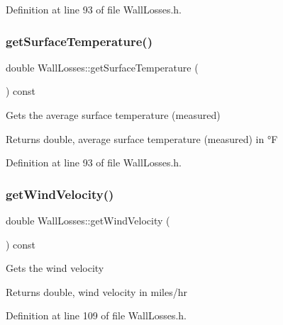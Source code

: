 Definition at line 93 of file Wall\+Losses.\+h.

\mbox{\label{class_wall_losses_ac2ce3cea6eef435a5fcf6a659b8e7d70}} 
\subsubsection{\texorpdfstring{get\+Surface\+Temperature()}{getSurfaceTemperature()}\hspace{0.1cm}{\footnotesize\ttfamily [3/3]}}
{\footnotesize\ttfamily double Wall\+Losses\+::get\+Surface\+Temperature (\begin{DoxyParamCaption}{ }\end{DoxyParamCaption}) const\hspace{0.3cm}{\ttfamily [inline]}}

Gets the average surface temperature (measured) \begin{DoxyReturn}{Returns}
double, average surface temperature (measured) in °F 
\end{DoxyReturn}


Definition at line 93 of file Wall\+Losses.\+h.

\mbox{\label{class_wall_losses_ae68657cacdfbaf8cdc48324dd580cf3b}} 
\subsubsection{\texorpdfstring{get\+Wind\+Velocity()}{getWindVelocity()}\hspace{0.1cm}{\footnotesize\ttfamily [1/3]}}
{\footnotesize\ttfamily double Wall\+Losses\+::get\+Wind\+Velocity (\begin{DoxyParamCaption}{ }\end{DoxyParamCaption}) const\hspace{0.3cm}{\ttfamily [inline]}}

Gets the wind velocity \begin{DoxyReturn}{Returns}
double, wind velocity in miles/hr 
\end{DoxyReturn}


Definition at line 109 of file Wall\+Losses.\+h.

